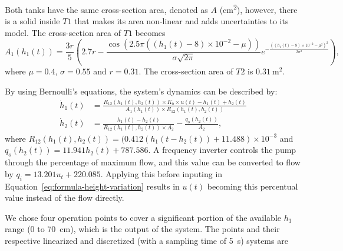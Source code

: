 Both tanks have the same cross-section area, denoted as \(A\)
(\si{\square\centi\metre}), however, there is a solid inside \(T1\) that makes its
area non-linear and adds uncertainties to its model. The cross-section area of
\(T1\) becomes
%
\begin{equation}
  \label{eq:t1-area}
  A_{1}(h_{1}(t)) = \frac{3r}{5} \left(
  2.7r - \frac{\cos(2.5\pi{}((h_{1}(t)-8)\times{}10^{-2}-\mu))}{\sigma{}\sqrt{2\pi}}
  e^{-\frac{((h_{1}(t)-8)\times{}10^{-2}-\mu^{2})^{2}}{2\sigma^{2}}}
  \right),
\end{equation}
%
where \(\mu=0.4\), \(\sigma=0.55\) and \(r=0.31\). The cross-section area of \(T2\) is
\(\SI{0.31}{\square\metre}\).

By using Bernoulli's equations, the system's dynamics can be described by:
%
\begin{equation}
  \label{eq:formula-height-variation}
  \begin{aligned}
    \dot{h}_1(t) & = \frac{R_{12}(h_{1}(t),h_{2}(t))\times{}K_{b}\times{}u(t)-h_{1}(t)+h_{2}(t)}
    {A_{1}(h_{1}(t))\times{}R_{12}(h_{1}(t),h_{2}(t))}                                                                 \\
    \dot{h}_2(t) & = \frac{h_{1}(t)-h_{2}(t)}{R_{12}(h_{1}(t),h_{2}(t))\times{}A_{2}} - \frac{q_{o}(h_{2}(t))}{A_{2}},
  \end{aligned}
\end{equation}
%
where \(R_{12}(h_{1}(t),h_{2}(t))=(0.412(h_{1}(t-h_{2}(t))+11.488)\times{}10^{-3}\)
and \(q_{o}(h_{2}(t))=11.941h_{2}(t)+787.586\). A frequency inverter controls
the pump through the percentage of maximum flow, and this value can be converted
to flow by \(q_{i}=13.201u_{t}+220.085\). Applying this before inputing in
Equation~\eqref{eq:formula-height-variation} results in \(u(t)\) becoming this
percentual value instead of the flow directly.

We chose four operation points to cover a significant portion of the available
\(h_{1}\) range (0 to \SI{70}{\centi\metre}), which is the output of the system.
The points and their respective linearized and discretized (with a sampling time
of \SI{5}{\second}) systems are

